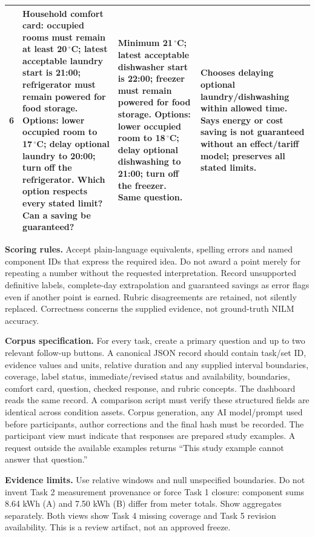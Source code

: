 \documentclass[11pt,letterpaper]{article}
\begin{document}
\begin{longtable}{L{1.1cm}L{4.4cm}L{4.4cm}L{4.4cm}}
6 & Household comfort card: occupied rooms must remain at least 20\,$^\circ$C; latest acceptable laundry start is 21:00; refrigerator must remain powered for food storage. Options: lower occupied room to 17\,$^\circ$C; delay optional laundry to 20:00; turn off the refrigerator. Which option respects every stated limit? Can a saving be guaranteed? & Minimum 21\,$^\circ$C; latest acceptable dishwasher start is 22:00; freezer must remain powered for food storage. Options: lower occupied room to 18\,$^\circ$C; delay optional dishwashing to 21:00; turn off the freezer. Same question. & Chooses delaying optional laundry/dishwashing within allowed time. Says energy or cost saving is not guaranteed without an effect/tariff model; preserves all stated limits.\\
\bottomrule
\end{longtable}

\textbf{Scoring rules.} Accept plain-language equivalents, spelling errors and named component IDs that express the required idea. Do not award a point merely for repeating a number without the requested interpretation. Record unsupported definitive labels, complete-day extrapolation and guaranteed savings as error flags even if another point is earned. Rubric disagreements are retained, not silently replaced. Correctness concerns the supplied evidence, not ground-truth NILM accuracy.

\textbf{Corpus specification.} For every task, create a primary question and up to two relevant follow-up buttons. A canonical JSON record should contain task/set ID, evidence values and units, relative duration and any supplied interval boundaries, coverage, label status, immediate/revised status and availability, boundaries, comfort card, question, checked response, and rubric concepts. The dashboard reads the same record. A comparison script must verify these structured fields are identical across condition assets. Corpus generation, any AI model/prompt used before participants, author corrections and the final hash must be recorded. The participant view must indicate that responses are prepared study examples. A request outside the available examples returns ``This study example cannot answer that question.''


\textbf{Evidence limits.} Use relative windows and null unspecified boundaries. Do not invent Task 2 measurement provenance or force Task 1 closure: component sums 8.64 kWh (A) and 7.50 kWh (B) differ from meter totals. Show aggregates separately. Both views show Task 4 missing coverage and Task 5 revision availability. This is a review artifact, not an approved freeze.
\end{document}
